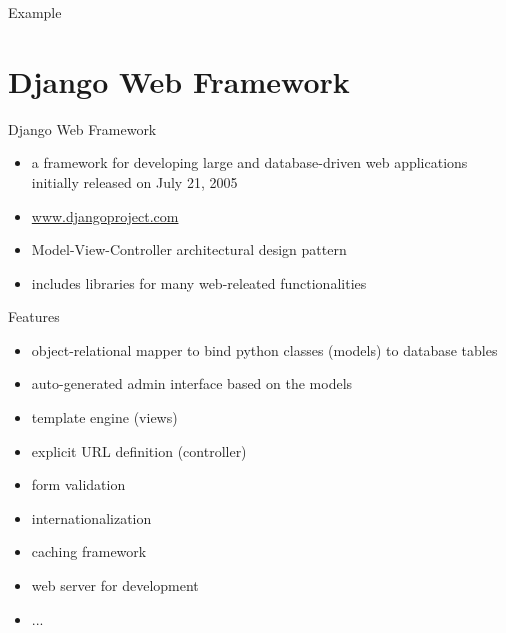 \documentclass{beamer}
\begin{document}
\begin{frame}{Example}
  \lstpython
\end{frame}



\section{Django Web Framework}

\begin{frame}{Django Web Framework}
 
  \begin{itemize}
    \item a framework for developing large and database-driven
      web applications initially released 
      on July 21, 2005
    \item \href{https://www.djangoproject.com/}{www.djangoproject.com}
    \item Model-View-Controller architectural design pattern
    \item includes libraries for many web-releated functionalities
  \end{itemize}
  
\end{frame}


\begin{frame}{Features}
 
  \begin{itemize}
    \item object-relational mapper to bind python classes (models)
      to database tables
    \item auto-generated admin interface based on the models
    \item template engine (views)
    \item explicit URL definition (controller)
    \item form validation
    \item internationalization
    \item caching framework
    \item web server for development
    \item ...
  \end{itemize}
  
\end{frame}



\end{document}

